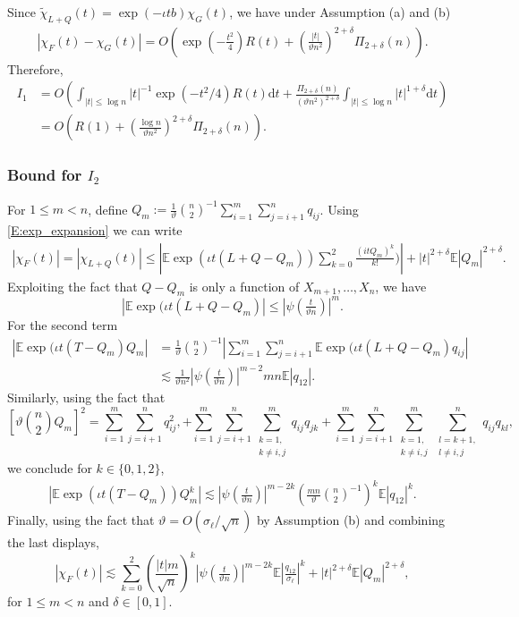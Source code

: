 \documentclass[11pt]{article}
\numberwithin{equation}{section}
\theoremstyle{definition}
\newcommand{\E}{\mathbb{E}}
\def\ls{\lesssim}
\def\d{\mathrm{d}}
\newcommand{\Scale}{\vartheta}
\begin{document}
Since $\widetilde{\chi}_{L+Q}(t) = \exp(-\iota tb)\chi_G(t)$, we have under Assumption (a) and (b)
\begin{align*}
 |\chi_F(t)-\chi_G(t)| =  O\left(\exp\left(-\tfrac{t^2}{4}\right)R(t) + \left(\tfrac{|t|}{\Scale n^2}\right)^{2+\delta}\Pi_{2+\delta}(n)\right).
\end{align*}
Therefore,
\begin{align*}
I_1 &= O\left(\int_{|t|\leq\log n}|t|^{-1}\exp(-t^2/4)R(t)\d t + \frac{\Pi_{2+\delta}(n)}{(\Scale n^2)^{2+\delta}}\int_{|t|\leq\log n} |t|^{1+\delta}\d t\right) \\
& =   O\left(R(1) + \left(\frac{\log n}{\Scale n^2}\right)^{2+\delta}\Pi_{2+\delta}(n)\right).
\end{align*}
\subsubsection*{Bound for $I_2$}

For $1\leq m <n$, define $Q_m :=\tfrac{1}{\Scale}\binom{n}{2}^{-1}\sum_{i=1}^m\sum_{j=i+1}^n q_{ij}$. Using \eqref{E:exp_expansion}  we can write
\begin{align*}
|\chi_F(t)|=|\chi_{L+Q}(t)|\leq \left| \E	\exp(\iota t(L+Q-Q_m))\sum_{k=0}^2\frac{(itQ_m)^k}{k!})\right|+	|t|^{2+\delta}\E|Q_{m}|^{2+\delta}.
\end{align*}
Exploiting the fact that $Q - Q_m$ is only a function of $X_{m+1},\dots, X_n$, we have
\[|\E	\exp(\iota t(L + Q-Q_m)|\leq |\psi\left(\tfrac{t}{\Scale n}\right)|^{m}. \]
For the second term
\begin{align*}
|\E	\exp(\iota t(T-Q_m)Q_m|& =\frac{1}{\Scale}\binom{n}{2}^{-1}\left|\sum_{i=1}^m\sum_{j=i+1}^n \E	\exp(\iota t(L + Q-Q_m)q_{ij}\right|\\
&\ls \tfrac{1}{\Scale n^2}|\psi\left(\tfrac{t}{\Scale n}\right)|^{m-2}mn\E|q_{12}|.
\end{align*}
Similarly,  using the fact that 
\[\left[\Scale\binom{n}{2} Q_m\right]^2 =\sum_{i=1}^m\sum_{j=i+1}^nq_{ij}^2, +\sum_{i=1}^m\sum_{j=i+1}^n \sum_{\substack{k=1,\\k\neq i,j}}^m q_{ij}q_{jk}+ \sum_{i=1}^m\sum_{j=i+1}^n \sum_{\substack{k=1,\\k\neq i,j}}^m\sum_{\substack{l=k+1,\\l\neq i,j}}^nq_{ij}q_{kl}, \]
we conclude for $k\in\{0,1,2\}$, 
\begin{align*}
|\E	\exp(\iota t(T-Q_m))Q_m^k| \ls |\psi\left(\tfrac{t}{\Scale n}\right)|^{m-2k}\left(\frac{mn}{\Scale}\binom{n}{2}^{-1}\right)^k \E|q_{12}|^k.
\end{align*}
Finally, using the fact that $\Scale = O (\sigma_\ell/\sqrt{n})$ by Assumption (b) and combining the last displays,
\begin{equation}\label{E:large_deviation_bound}
|\chi_F(t)|\ls\sum_{k=0}^2 \left(\frac{|t|m}{\sqrt{n}}\right)^k |\psi\left(\tfrac{t}{\Scale n}\right)|^{m-2k} \E\left|\tfrac{q_{12}}{\sigma_\ell}\right|^k + |t|^{2+\delta}\E|Q_{m}|^{2+\delta},
\end{equation}
for $1\leq m<n$ and $\delta\in [0,1]$.
\end{document}
